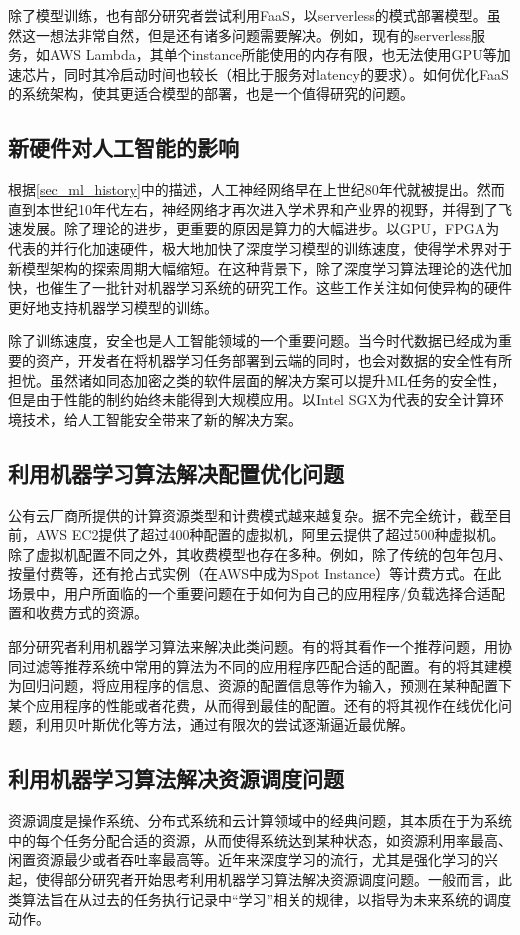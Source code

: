 除了模型训练，也有部分研究者尝试利用FaaS，以serverless的模式部署模型。虽然这一想法非常自然，但是还有诸多问题需要解决。例如，现有的serverless服务，如AWS Lambda，其单个instance所能使用的内存有限，也无法使用GPU等加速芯片，同时其冷启动时间也较长（相比于服务对latency的要求）。如何优化FaaS的系统架构，使其更适合模型的部署，也是一个值得研究的问题。

\subsection{新硬件对人工智能的影响}
根据\ref{sec_ml_history}中的描述，人工神经网络早在上世纪80年代就被提出。然而直到本世纪10年代左右，神经网络才再次进入学术界和产业界的视野，并得到了飞速发展。除了理论的进步，更重要的原因是算力的大幅进步。以GPU，FPGA为代表的并行化加速硬件，极大地加快了深度学习模型的训练速度，使得学术界对于新模型架构的探索周期大幅缩短。在这种背景下，除了深度学习算法理论的迭代加快，也催生了一批针对机器学习系统的研究工作。这些工作关注如何使异构的硬件更好地支持机器学习模型的训练。

除了训练速度，安全也是人工智能领域的一个重要问题。当今时代数据已经成为重要的资产，开发者在将机器学习任务部署到云端的同时，也会对数据的安全性有所担忧。虽然诸如同态加密之类的软件层面的解决方案可以提升ML任务的安全性，但是由于性能的制约始终未能得到大规模应用。以Intel SGX\parencite{costan2016intel}为代表的安全计算环境技术，给人工智能安全带来了新的解决方案。

\subsection{利用机器学习算法解决配置优化问题}
公有云厂商所提供的计算资源类型和计费模式越来越复杂。据不完全统计，截至目前，AWS EC2提供了超过400种配置的虚拟机，阿里云提供了超过500种虚拟机。除了虚拟机配置不同之外，其收费模型也存在多种。例如，除了传统的包年包月、按量付费等，还有抢占式实例（在AWS中成为Spot Instance）\parencite{awsspot}等计费方式。在此场景中，用户所面临的一个重要问题在于如何为自己的应用程序/负载选择合适配置和收费方式的资源。

部分研究者利用机器学习算法来解决此类问题。有的将其看作一个推荐问题\parencite{klimovic2018selecta}，用协同过滤等推荐系统中常用的算法为不同的应用程序匹配合适的配置。有的将其建模为回归问题\parencite{yadwadkar2017selecting,venkataraman2016ernest,moradi2019performance,zheng2019online}，将应用程序的信息、资源的配置信息等作为输入，预测在某种配置下某个应用程序的性能或者花费，从而得到最佳的配置。还有的将其视作在线优化问题\parencite{alipourfard2017cherrypick,casimiro2019lynceus}，利用贝叶斯优化等方法，通过有限次的尝试逐渐逼近最优解。

\subsection{利用机器学习算法解决资源调度问题}
资源调度是操作系统、分布式系统和云计算领域中的经典问题，其本质在于为系统中的每个任务分配合适的资源，从而使得系统达到某种状态，如资源利用率最高、闲置资源最少或者吞吐率最高等。近年来深度学习的流行，尤其是强化学习的兴起，使得部分研究者开始思考利用机器学习算法解决资源调度问题\parencite{delimitrou2014quasar,mao2019learning,chung2018stratus}。一般而言，此类算法旨在从过去的任务执行记录中“学习”相关的规律，以指导为未来系统的调度动作。
